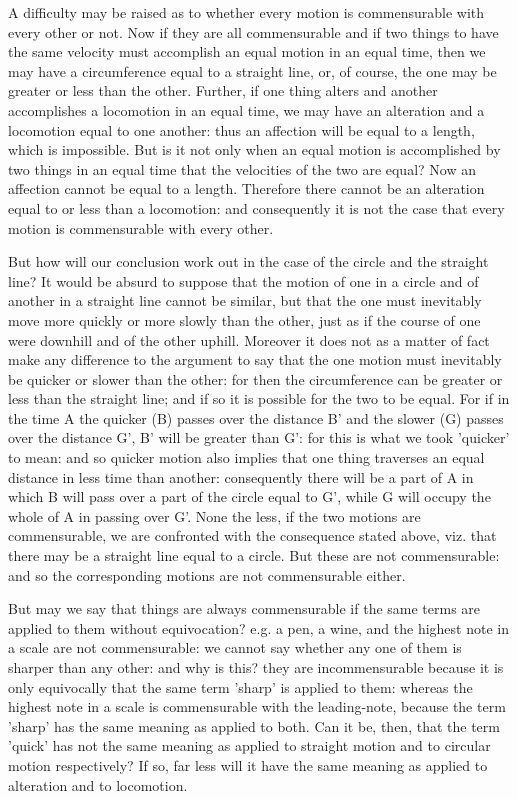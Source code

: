 A difficulty may be raised as to whether every motion is commensurable
with every other or not. Now if they are all commensurable and if
two things to have the same velocity must accomplish an equal motion
in an equal time, then we may have a circumference equal to a straight
line, or, of course, the one may be greater or less than the other.
Further, if one thing alters and another accomplishes a locomotion
in an equal time, we may have an alteration and a locomotion equal
to one another: thus an affection will be equal to a length, which
is impossible. But is it not only when an equal motion is accomplished
by two things in an equal time that the velocities of the two are
equal? Now an affection cannot be equal to a length. Therefore there
cannot be an alteration equal to or less than a locomotion: and consequently
it is not the case that every motion is commensurable with every other.

But how will our conclusion work out in the case of the circle and
the straight line? It would be absurd to suppose that the motion of
one in a circle and of another in a straight line cannot be similar,
but that the one must inevitably move more quickly or more slowly
than the other, just as if the course of one were downhill and of
the other uphill. Moreover it does not as a matter of fact make any
difference to the argument to say that the one motion must inevitably
be quicker or slower than the other: for then the circumference can
be greater or less than the straight line; and if so it is possible
for the two to be equal. For if in the time A the quicker (B) passes
over the distance B' and the slower (G) passes over the distance G',
B' will be greater than G': for this is what we took 'quicker' to
mean: and so quicker motion also implies that one thing traverses
an equal distance in less time than another: consequently there will
be a part of A in which B will pass over a part of the circle equal
to G', while G will occupy the whole of A in passing over G'. None
the less, if the two motions are commensurable, we are confronted
with the consequence stated above, viz. that there may be a straight
line equal to a circle. But these are not commensurable: and so the
corresponding motions are not commensurable either. 

But may we say that things are always commensurable if the same terms
are applied to them without equivocation? e.g. a pen, a wine, and
the highest note in a scale are not commensurable: we cannot say whether
any one of them is sharper than any other: and why is this? they are
incommensurable because it is only equivocally that the same term
'sharp' is applied to them: whereas the highest note in a scale is
commensurable with the leading-note, because the term 'sharp' has
the same meaning as applied to both. Can it be, then, that the term
'quick' has not the same meaning as applied to straight motion and
to circular motion respectively? If so, far less will it have the
same meaning as applied to alteration and to locomotion.

